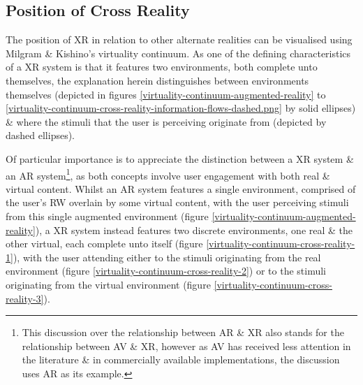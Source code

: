 

\subsection{Position of Cross Reality}

\label{positionofcrossreality}

\newcommand{\avxrfootnote}{\footnote{This discussion over the relationship between AR \& XR also stands for the relationship between AV \& XR, however as AV has received less attention in the literature \& in commercially available implementations, the discussion uses AR as its example.}}

The position of XR in relation to other alternate realities can be visualised using Milgram \& Kishino's virtuality continuum. As one of the defining characteristics of a XR system is that it features two environments, both complete unto themselves, the explanation herein distinguishes between environments themselves (depicted in figures \ref{virtuality-continuum-augmented-reality} to \ref{virtuality-continuum-cross-reality-information-flows-dashed.png} by solid ellipses) \& where the stimuli that the user is perceiving originate from (depicted by dashed ellipses).


Of particular importance is to appreciate the distinction between a XR system \& an AR system\avxrfootnote{}, as both concepts involve user engagement with both real \& virtual content. Whilst an AR system features a single environment, comprised of the user's RW overlain by some virtual content, with the user perceiving stimuli from this single augmented environment (figure \ref{virtuality-continuum-augmented-reality}), a XR system instead features two discrete environments, one real \& the other virtual, each complete unto itself (figure \ref{virtuality-continuum-cross-reality-1}), with the user attending either to the stimuli originating from the real environment (figure \ref{virtuality-continuum-cross-reality-2}) or to the stimuli originating from the virtual environment (figure \ref{virtuality-continuum-cross-reality-3}).

